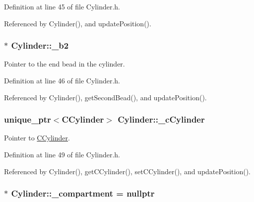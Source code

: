 Definition at line 45 of file Cylinder.\+h.



Referenced by Cylinder(), and update\+Position().

\hypertarget{classCylinder_a10fe1bbf3340a35637e4a966c1035af6}{
\subsubsection[{\+\_\+b2}]{$\ast$ Cylinder\+::\+\_\+b2\hspace{0.3cm}{\ttfamily [private]}}}\label{classCylinder_a10fe1bbf3340a35637e4a966c1035af6}


Pointer to the end bead in the cylinder. 



Definition at line 46 of file Cylinder.\+h.



Referenced by Cylinder(), get\+Second\+Bead(), and update\+Position().

\hypertarget{classCylinder_aacbbbcef8a8a2b6e5810884b017af516}{
\subsubsection[{\+\_\+c\+Cylinder}]{\setlength{\rightskip}{0pt plus 5cm}unique\+\_\+ptr$<${\bf C\+Cylinder}$>$ Cylinder\+::\+\_\+c\+Cylinder\hspace{0.3cm}{\ttfamily [private]}}}\label{classCylinder_aacbbbcef8a8a2b6e5810884b017af516}


Pointer to \hyperlink{classCCylinder}{C\+Cylinder}. 



Definition at line 49 of file Cylinder.\+h.



Referenced by Cylinder(), get\+C\+Cylinder(), set\+C\+Cylinder(), and update\+Position().

\hypertarget{classCylinder_a2d8861ef62351377c0f6f7ab583cf8d5}{
\subsubsection[{\+\_\+compartment}]{$\ast$ Cylinder\+::\+\_\+compartment = nullptr\hspace{0.3cm}{\ttfamily [private]}}}\label{classCylinder_a2d8861ef62351377c0f6f7ab583cf8d5}


